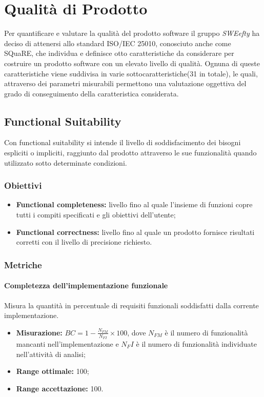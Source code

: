 \section{Qualità di Prodotto}
Per quantificare e valutare la qualità del prodotto software il gruppo \textit{SWEefty} ha deciso di attenersi allo standard ISO/IEC 25010, conosciuto anche come SQuaRE, che individua e definisce otto caratteristiche da considerare per costruire un prodotto software con un elevato livello di qualità. Ognuna di queste caratteristiche viene suddivisa in varie sottocaratteristiche(31 in totale), le quali, attraverso dei parametri misurabili  permettono una valutazione oggettiva del grado di conseguimento della caratteristica considerata.
 
	\subsection{Functional Suitability}
	Con functional suitability si intende il livello di soddisfacimento dei bisogni espliciti o impliciti, raggiunto dal prodotto attraverso le sue funzionalità quando utilizzato sotto determinate condizioni.
		\subsubsection{Obiettivi}
			\begin{itemize}
				\item {\textbf{Functional completeness:} livello fino al quale l'insieme di funzioni copre tutti i compiti specificati e gli obiettivi dell'utente;}
				\item {\textbf{Functional correctness:} livello fino al quale un prodotto fornisce risultati corretti con il livello di precisione richiesto.}
			\end{itemize}
		\subsubsection{Metriche}
			\paragraph{Completezza dell'implementazione funzionale}\Spazio
			 Misura la quantità in percentuale di requisiti funzionali soddisfatti dalla corrente implementazione.
			\begin{itemize}
				\item {\textbf{Misurazione:}  $BC=1-\frac{N_{FM}}{N_{FI}}\times 100$, dove $N_{FM}$  è il numero di funzionalità mancanti nell'implementazione e $N_FI$ è il numero di funzionalità individuate nell'attività di analisi};
				\item {\textbf{Range ottimale:} 100;}
				\item {\textbf{Range accettazione:} 100.}
			\end{itemize} 

